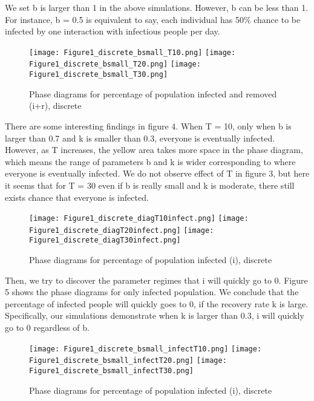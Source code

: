 \documentclass{article}
\begin{document}
We set b is larger than 1 in the above simulations. However, b can be less than 1. For instance, b = 0.5 is equivalent to say, each individual has 50$\%$ chance to be infected by one interaction with infectious people per day.


\begin{figure}[htp]

\centering
\texttt{[image: Figure1\_discrete\_bsmall\_T10.png]}\hfill
\texttt{[image: Figure1\_discrete\_bsmall\_T20.png]}\hfill
\texttt{[image: Figure1\_discrete\_bsmall\_T30.png]}

\caption{Phase diagrams for percentage of population infected and removed (i+r), discrete}
\label{fig:figure3}

\end{figure}


There are some interesting findings in figure 4. When T = 10, only when b is larger than 0.7 and k is smaller than 0.3, everyone is eventually infected. However, as T increases, the yellow area takes more space in the phase diagram, which means the range of parameters b and k is wider corresponding to where everyone is eventually infected. We do not observe effect of T in figure 3, but here it seems that for T = 30 even if b is really small and k is moderate, there still exists chance that everyone is infected.



\begin{figure}[htp]

\centering
\texttt{[image: Figure1\_discrete\_diagT10infect.png]}\hfill
\texttt{[image: Figure1\_discrete\_diagT20infect.png]}\hfill
\texttt{[image: Figure1\_discrete\_diagT30infect.png]}

\caption{Phase diagrams for percentage of population infected (i), discrete}
\label{fig:figure3}

\end{figure}


Then, we try to discover the parameter regimes that i will quickly go to 0. Figure 5 shows the phase diagrams for only infected population. We conclude that the percentage of infected people will quickly goes to 0, if the recovery rate k is large. Specifically, our simulations demonstrate when k is larger than 0.3, i will quickly go to 0 regardless of b.



\begin{figure}[htp]

\centering
\texttt{[image: Figure1\_discrete\_bsmall\_infectT10.png]}\hfill
\texttt{[image: Figure1\_discrete\_bsmall\_infectT20.png]}\hfill
\texttt{[image: Figure1\_discrete\_bsmall\_infectT30.png]}

\caption{Phase diagrams for percentage of population infected (i), discrete}
\label{fig:figure3}

\end{figure}
\end{document}
